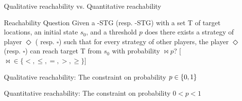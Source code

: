 \documentclass{beamer}
\begin{document}
       \begin{frame}{Qualitative reachability vs. Quantitative reachability}
         \begin{alertblock}{Reachability Question}
           \scriptsize
           Given a \twohalf-STG (resp. \onehalf-STG) \stg{} with a set T of target locations, an
           initial state $s_0$, and a threshold $ p$ does
           there exists a strategy of player $\Diamond$ ( resp. $\square$)
           such that for every strategy of other players, the
           player $\Diamond$ (resp. $\square$)  can reach target T from $s_0$
           with probability $\bowtie p$? [$\bowtie \in \{<,\leq,=,>,\geq \}$]
           \pause
           \end{alertblock}
         \begin{block}{Qualitative reachability:}
          The constraint on probability $ p\in \{ 0, 1 \}$
         \end{block}
         \begin{block}{Quantitative reachability:}
            The constraint on probability $ 0 < p < 1$

         \end{block}

       \end{frame}
\end{document}

